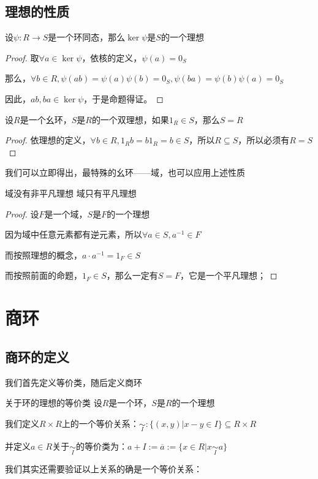 \documentclass[12pt, a4paper, oneside, UTF8]{ctexbook}
\begin{document}
		\subsection{理想的性质}
		\begin{para}{0}
			\point{}
				\begin{proposition}
					设$\psi :R \rightarrow S$是一个环同态，那么$\ker \psi$是$S$的一个理想
				\end{proposition}
				\begin{proof}
					取$\forall a \in \ker \psi$，依核的定义，$\psi (a)=0_S$

					那么，$\forall b \in R,\psi (ab)=\psi (a)\psi (b)=0_S,\psi (ba)=\psi (b)\psi (a)=0_S$

					因此，$ab,ba \in \ker \psi$，于是命题得证。
				\end{proof}
			\point{}
				\begin{proposition}
					设$R$是一个幺环，$S$是$R$的一个双理想，如果$1_R \in S$，那么$S=R$
				\end{proposition}
				\begin{proof}
					依理想的定义，$\forall b \in R,1_R b=b 1_R = b \in S$，所以$R \subseteq S$，所以必须有$R=S$
				\end{proof}
				我们可以立即得出，最特殊的幺环——域，也可以应用上述性质
				\begin{corollary}{域没有非平凡理想}{}
					域只有平凡理想
				\end{corollary}
				\begin{proof}
					设$F$是一个域，$S$是$F$的一个理想

					因为域中任意元素都有逆元素，所以$\forall a \in S,a^{-1} \in F$

					而按照理想的概念，$a \cdot a^{-1}=1_F \in S$

					而按照前面的命题，$1_F \in S$，那么一定有$S = F$，它是一个平凡理想；
				\end{proof}
		\end{para}
	\section{商环}
		\subsection{商环的定义}
			我们首先定义等价类，随后定义商环
			\begin{defn}{关于环的理想的等价类}{}
				设$R$是一个环，$S$是$R$的一个理想
				
				我们定义$R \times R$上的一个等价关系：$\underset{I}{\sim} : \{(x,y) | x-y \in I\} \subseteq R \times R$

				并定义$a \in R$关于$\underset{I}{\sim}$的等价类为：$a +I :=\overline{a} := \{x \in R | x \underset{I}{\sim} a\}$
			\end{defn}
			我们其实还需要验证以上关系的确是一个等价关系：
\end{document}
